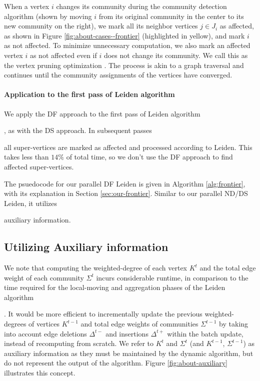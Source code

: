 When a vertex $i$ changes its community during the community detection algorithm (shown by moving $i$ from its original community in the center to its new community on the right), we mark all its neighbor vertices $j \in J_i$ as affected, as shown in Figure \ref{fig:about-cases--frontier} (highlighted in yellow), and mark $i$ as not affected. To minimize unnecessary computation, we also mark an affected vertex $i$ as not affected even if $i$ does not change its community. We call this as the vertex pruning optimization \cite{com-ozaki16, com-ryu16, com-shi21, com-zhang21}. The process is akin to a graph traversal and continues until the community assignments of the vertices have converged.

\paragraph{Application to the first pass of Leiden algorithm}

We apply the DF approach to the first pass of Leiden algorithm, as with the DS approach. In subsequent passes all super-vertices are marked as affected and processed according to Leiden. This takes less than $14\%$ of total time, so we don't use the DF approach to find affected super-vertices. The psuedocode for our parallel DF Leiden is given in Algorithm \ref{alg:frontier}, with its explanation in Section \ref{sec:our-frontier}. Similar to our parallel ND/DS Leiden, it utilizes auxiliary information.




\subsection{Utilizing Auxiliary information}
\label{sec:auxiliary}

We note that computing the weighted-degree of each vertex $K^t$ and the total edge weight of each community $\Sigma^t$ incurs considerable runtime, in comparison to the time required for the local-moving and aggregation phases of the Leiden algorithm. It would be more efficient to incrementally update the previous weighted-degrees of vertices $K^{t-1}$ and total edge weights of communities $\Sigma^{t-1}$ by taking into account edge deletions $\Delta^{t-}$ and insertions $\Delta^{t+}$ within the batch update, instead of recomputing from scratch. We refer to $K^t$ and $\Sigma^t$ (and $K^{t-1}$, $\Sigma^{t-1}$) as auxiliary information as they must be maintained by the dynamic algorithm, but do not represent the output of the algorithm. Figure \ref{fig:about-auxiliary} illustrates this concept.

